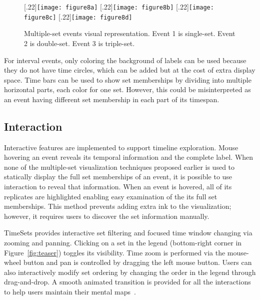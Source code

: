 \begin{figure}[ht]
	\centering
	[.22\columnwidth]{\texttt{[image: figure8a]}}
	\hfill
	[.22\columnwidth]{\texttt{[image: figure8b]}}
	\hfill
	[.22\columnwidth]{\texttt{[image: figure8c]}}
	\hfill
	[.22\columnwidth]{\texttt{[image: figure8d]}}
	\caption{Multiple-set events visual representation. Event 1 is single-set. Event 2 is double-set. Event 3 is triple-set.}
	\label{fig:eventmembership}
\end{figure}

For interval events, only coloring the background of labels can be used because they do not have time circles, which can be added but at the cost of extra display space. Time bars can be used to show set memberships by dividing into multiple horizontal parts, each color for one set. However, this could be misinterpreted as an event having different set membership in each part of its timespan.

\subsection{Interaction}
\label{sub:interaction}
Interactive features are implemented to support timeline exploration. Mouse hovering an event reveals its temporal information and the complete label. When none of the multiple-set visualization techniques proposed earlier is used to statically display the full set memberships of an event, it is possible to use interaction to reveal that information. When an event is hovered, all of its replicates are highlighted enabling easy examination of the its full set memberships. This method prevents adding extra ink to the visualization; however, it requires users to discover the set information manually. 

TimeSets provides interactive set filtering and focused time window changing via zooming and panning. Clicking on a set in the legend (bottom-right corner in Figure~\ref{fig:teaser}) toggles its visibility. Time zoom is performed via the mouse-wheel button and pan is controlled by dragging the left mouse button. Users can also interactively modify set ordering by changing the order in the legend through drag-and-drop. A smooth animated transition is provided for all the interactions to help users maintain their mental maps~\cite{Elmqvist2011}.